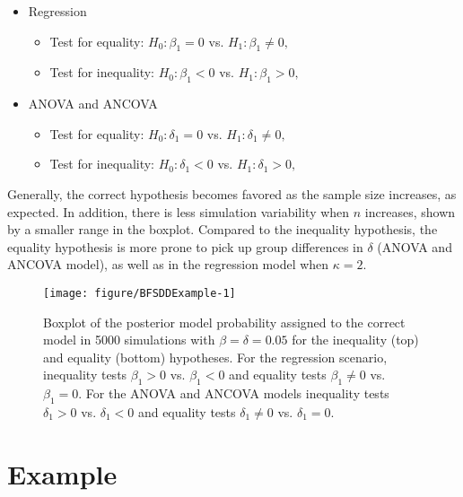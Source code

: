 \begin{itemize}
\item Regression
\begin{itemize}
\item Test for equality:  \( H_0 : \beta_1 = 0 \) vs. \( H_1 : \beta_1 \neq 0,\)
\item Test for inequality:  \( H_0 : \beta_1 < 0 \) vs. \( H_1 : \beta_1 > 0,\)
\end{itemize}
\item ANOVA and ANCOVA
\begin{itemize}
\item Test for equality:  \( H_0 : \delta_1 = 0 \) vs. \( H_1 : \delta_1 \neq 0,\)
\item Test for inequality:  \( H_0 : \delta_1 < 0 \) vs. \( H_1 : \delta_1 > 0,\)
\end{itemize}
\end{itemize}

Generally, the correct hypothesis becomes favored as the sample size increases, as expected. In addition, there is less simulation variability when \( n \) increases, shown by a smaller range in the boxplot. Compared to the inequality hypothesis, the equality hypothesis is more prone to pick up group differences in \( \delta \) (ANOVA and ANCOVA model), as well as in the regression model when \( \kappa = 2.\)

\begin{figure}
\begin{knitrout}
\color{fgcolor}
\texttt{[image: figure/BFSDDExample-1]} 

\end{knitrout}
\caption{Boxplot of the posterior model probability assigned to the correct model in 5000 simulations with \( \beta = \delta = 0.05 \) for the inequality (top) and equality (bottom) hypotheses. For the regression scenario, inequality tests \( \beta_1 > 0 \) vs. \( \beta_1 < 0 \) and equality tests \( \beta_1 \neq 0 \) vs. \( \beta_1 = 0 \). For the ANOVA and ANCOVA models inequality tests \( \delta_1 > 0 \) vs. \( \delta_1 < 0 \) and equality tests \( \delta_1 \neq 0 \) vs. \( \delta_1 = 0 \).}
\label{BFSimStud}
\end{figure}











\section{Example}

